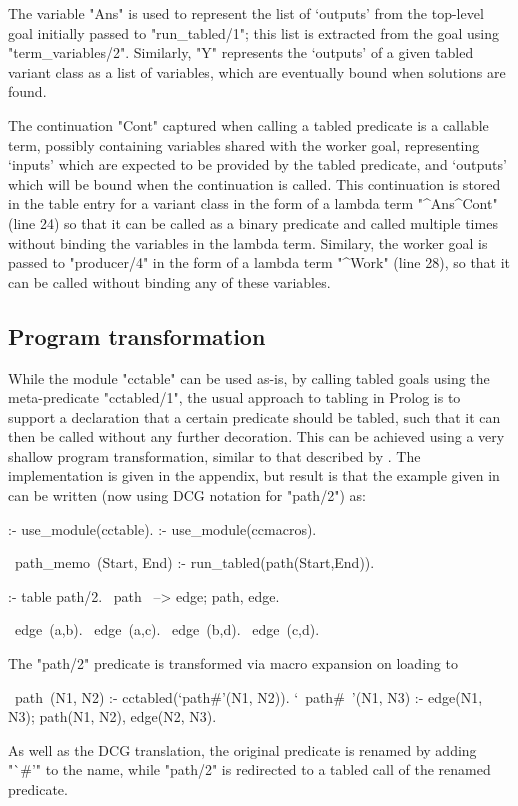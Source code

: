The variable "Ans" is used 
to represent the list of `outputs' from the top-level goal initially passed
to "run_tabled/1"; this list is extracted from the goal using "term_variables/2".
Similarly, "Y" represents the `outputs' of a given tabled variant class as a list
of variables, which are eventually bound when solutions are found.

The continuation "Cont" captured when
calling a tabled predicate is a callable term, possibly containing variables shared
with the worker goal, representing `inputs' which are expected to be 
provided by the tabled predicate, and `outputs'
which will be bound when the continuation is called. This continuation is stored
in the table entry for a variant class in the form of a lambda term
"\Y^Ans^Cont" (line 24) so that it can be called as a binary predicate and called multiple times
without binding the variables in the lambda term. Similary, the worker goal 
is passed to "producer/4" in the form of a lambda term "\Y^Work" (line 28),
so that it can be called without binding any of these variables.

\subsection{Program transformation}
While the module "cctable" can be used as-is, by calling tabled goals using the
meta-predicate "cctabled/1", the usual approach to tabling in Prolog is to support a
declaration that a certain predicate should be tabled, such that it can then be
called without any further decoration. This can be achieved using a very shallow
program transformation, similar to that described by \cite{DesouterVan-DoorenSchrijvers2015}.
The implementation is given in the appendix, but result is that the example given 
in  can be written (now using DCG notation for "path/2") as:
\begin{prolog-framed}
  :- use_module(cctable).
  :- use_module(ccmacros).

  ~path_memo~(Start, End) :- run_tabled(path(Start,End)).

  :- table path/2.
  ~path~ --> edge; path, edge.

  ~edge~(a,b).  ~edge~(a,c).  ~edge~(b,d).  ~edge~(c,d).
\end{prolog-framed}
The "path/2" predicate is transformed via macro expansion on loading to
\begin{prolog}
  ~path~(N1, N2)     :- cctabled(`path#'(N1, N2)).
  `~path#~'(N1, N3) :- edge(N1, N3); path(N1, N2), edge(N2, N3).
\end{prolog}
As well as the DCG translation, the original predicate is renamed by
adding "`#'" to the name, while "path/2" is redirected to a tabled
call of the renamed predicate.


